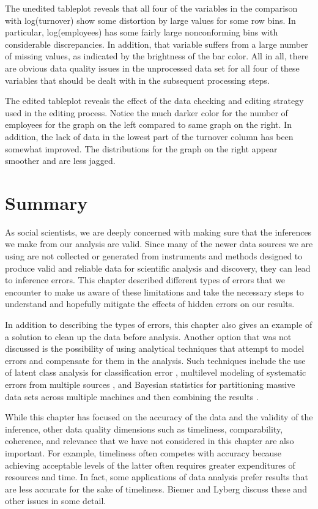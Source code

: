 \documentclass[]{krantz}
\begin{document}
The unedited tableplot reveals that all four of the variables in the
comparison with log(turnover) show some distortion by large values for
some row bins. In particular, log(employees) has some fairly large
nonconforming bins with considerable discrepancies. In addition, that
variable suffers from a large number of missing values, as indicated by
the brightness of the bar color. All in all, there are obvious data
quality issues in the unprocessed data set for all four of these
variables that should be dealt with in the subsequent processing steps.

The edited tableplot reveals the effect of the data checking and editing
strategy used in the editing process. Notice the much darker color for
the number of employees for the graph on the left compared to same graph
on the right. In addition, the lack of data in the lowest part of the
turnover column has been somewhat improved. The distributions for the
graph on the right appear smoother and are less jagged.

\section{Summary}\label{sec:10-6}

As social scientists, we are deeply concerned with making sure that the
inferences we make from our analysis are valid. Since many of the newer
data sources we are using are not collected or generated from
instruments and methods designed to produce valid and reliable data for
scientific analysis and discovery, they can lead to inference errors.
This chapter described different types of errors that we encounter to
make us aware of these limitations and take the necessary steps to
understand and hopefully mitigate the effects of hidden errors on our
results.

In addition to describing the types of errors, this chapter also gives
an example of a solution to clean up the data before analysis. Another
option that was not discussed is the possibility of using analytical
techniques that attempt to model errors and compensate for them in the
analysis. Such techniques include the use of latent class analysis for
classification error \citep{biemer2011latent}, multilevel modeling of
systematic errors from multiple sources \citep{hox2010multilevel}, and
Bayesian statistics for partitioning massive data sets across multiple
machines and then combining the results
\citep{ibrahim2000power, scott2013bayes}.

While this chapter has focused on the accuracy of the data and the
validity of the inference, other data quality dimensions such as
timeliness, comparability, coherence, and relevance that we have not
considered in this chapter are also important. For example, timeliness
often competes with accuracy because achieving acceptable levels of the
latter often requires greater expenditures of resources and time. In
fact, some applications of data analysis prefer results that are less
accurate for the sake of timeliness. Biemer and Lyberg
\citeyearpar{biemer2003} discuss these and other issues in some detail.
\end{document}
